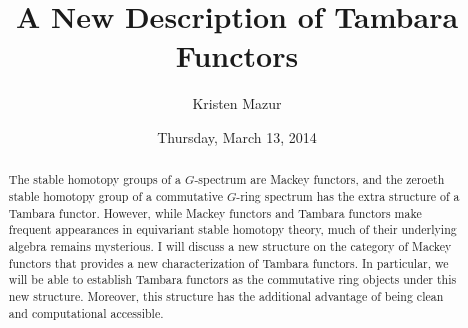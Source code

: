\documentclass{UAmathtalk}
\author{Kristen Mazur}
\title{A New Description of Tambara Functors}
\date{Thursday, March 13, 2014}
\begin{document}
\maketitle

\begin{abstract}
The stable homotopy groups of a $G$-spectrum are Mackey functors, and the zeroeth stable homotopy group of a commutative $G$-ring spectrum has the extra structure of a Tambara functor.
However, while Mackey functors and Tambara functors make frequent appearances in equivariant stable homotopy theory, much of their underlying algebra remains mysterious.
I will discuss a new structure on the category of Mackey functors that provides a new characterization of Tambara functors.
In particular, we will be able to establish Tambara functors as the commutative ring objects under this new structure.
Moreover, this structure has the additional advantage of being clean and computational accessible.
\end{abstract}
\end{document}
